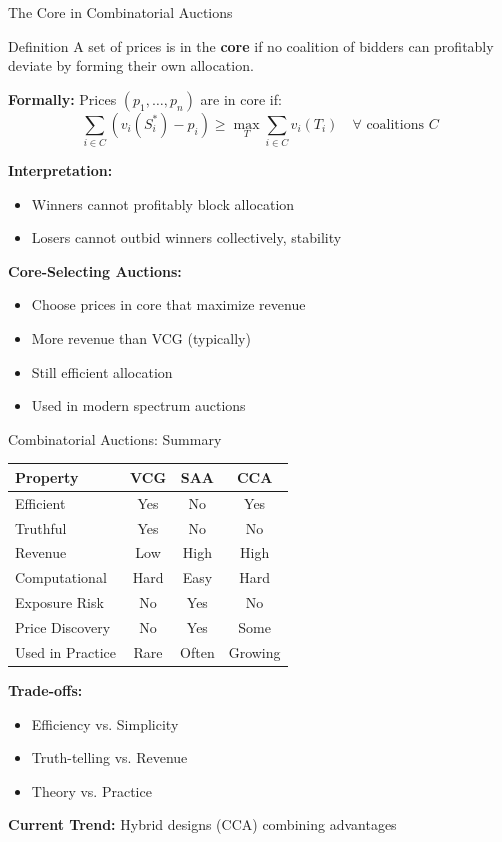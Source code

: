 \documentclass[xcolor={x11names}, aspectratio=169 ]{beamer}
\begin{document}
\begin{frame}{The Core in Combinatorial Auctions}
\begin{block}{Definition}
A set of prices is in the \textbf{core} if no coalition of bidders can profitably deviate by forming their own allocation.
\end{block}

\textbf{Formally:} Prices $(p_1, \ldots, p_n)$ are in core if:
$$\sum_{i \in C} (v_i(S_i^*) - p_i) \geq \max_{T} \sum_{i \in C} v_i(T_i) \quad \forall \text{ coalitions } C$$

\textbf{Interpretation:}
\begin{itemize}
  \item Winners cannot profitably block allocation
  \item Losers cannot outbid winners collectively, stability
\end{itemize}

\textbf{Core-Selecting Auctions:}
\begin{itemize}
  \item Choose prices in core that maximize revenue
  \item More revenue than VCG (typically)
  \item Still efficient allocation
  \item Used in modern spectrum auctions
\end{itemize}
\end{frame}

\begin{frame}{Combinatorial Auctions: Summary}
\begin{center}
\begin{tabular}{lccc}
\toprule
\textbf{Property} & \textbf{VCG} & \textbf{SAA} & \textbf{CCA} \\
\midrule
Efficient & Yes & No & Yes \\
Truthful & Yes & No & No \\
Revenue & Low & High & High \\
Computational & Hard & Easy & Hard \\
Exposure Risk & No & Yes & No \\
Price Discovery & No & Yes & Some \\
Used in Practice & Rare & Often & Growing \\
\bottomrule
\end{tabular}
\end{center}

\textbf{Trade-offs:}
\begin{itemize}
  \item Efficiency vs. Simplicity
  \item Truth-telling vs. Revenue
  \item Theory vs. Practice
\end{itemize}

\textbf{Current Trend:} Hybrid designs (CCA) combining advantages
\end{frame}
\end{document}
